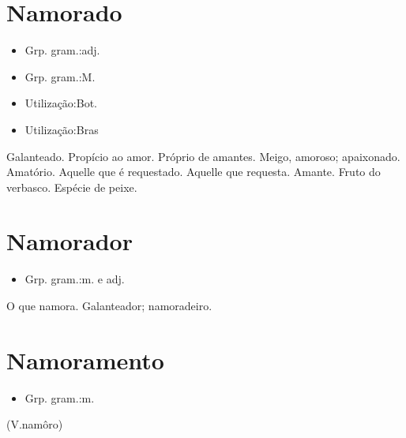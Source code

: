 \section{Namorado}
\begin{itemize}
\item {Grp. gram.:adj.}
\end{itemize}
\begin{itemize}
\item {Grp. gram.:M.}
\end{itemize}
\begin{itemize}
\item {Utilização:Bot.}
\end{itemize}
\begin{itemize}
\item {Utilização:Bras}
\end{itemize}
Galanteado.
Propício ao amor.
Próprio de amantes.
Meigo, amoroso; apaixonado.
Amatório.
Aquelle que é requestado.
Aquelle que requesta.
Amante.
Fruto do verbasco.
Espécie de peixe.
\section{Namorador}
\begin{itemize}
\item {Grp. gram.:m.  e  adj.}
\end{itemize}
O que namora.
Galanteador; namoradeiro.
\section{Namoramento}
\begin{itemize}
\item {Grp. gram.:m.}
\end{itemize}
(V.namôro)
